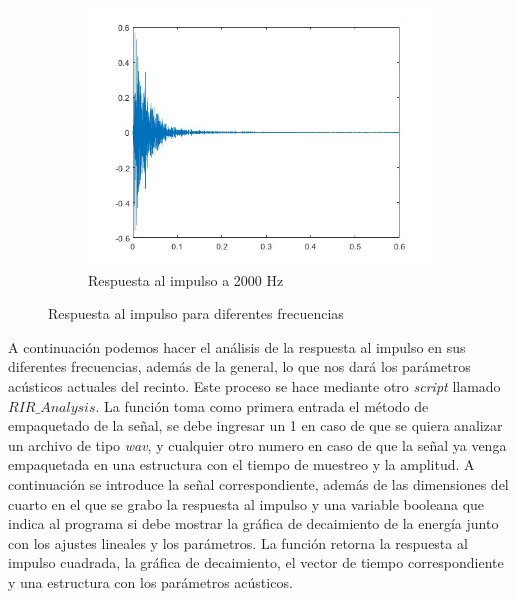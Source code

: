 \begin{figure}[!htb]
    \hfill
    \begin{subfigure}{0.3\textwidth}
        \centering
        \includegraphics[width=\linewidth]{imagenes/RIR_2000Hz_RIR_Measurement.jpg}
        \caption{\footnotesize Respuesta al impulso a 2000 Hz}
        \label{fig:sub2}
    \end{subfigure}
    \caption{Respuesta al impulso para diferentes frecuencias}
\end{figure}
\FloatBarrier

A continuación podemos hacer el análisis de la respuesta al impulso en sus diferentes frecuencias, además de la general, lo que nos dará los parámetros acústicos actuales del recinto. Este proceso se hace mediante otro \textit{script} llamado \textbf{$RIR\_Analysis$}.\hfill\break
La función toma como primera entrada el método de empaquetado de la señal, se debe ingresar un 1 en caso de que se quiera analizar un archivo de tipo \textit{wav}, y cualquier otro numero en caso de que la señal ya venga empaquetada en una estructura con el tiempo de muestreo y la amplitud. A continuación se introduce la señal correspondiente, además de las dimensiones del cuarto en el que se grabo la respuesta al impulso y una variable booleana que indica al programa si debe mostrar la gráfica de decaimiento de la energía junto con los ajustes lineales y los parámetros.
La función retorna la respuesta al impulso cuadrada, la gráfica de decaimiento, el vector de tiempo correspondiente y una estructura con los parámetros acústicos.

